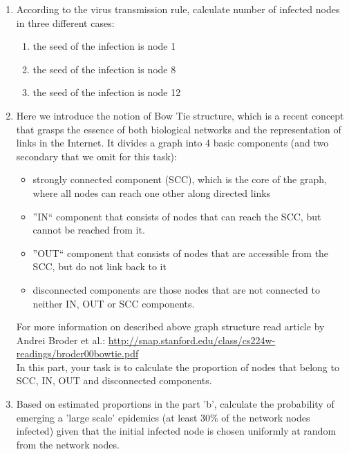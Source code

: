 \documentclass{article}
\begin{document}
\begin{enumerate}
\item According to the virus transmission rule, calculate number of infected nodes in three different cases:
\begin{enumerate}
\item  the seed of the infection is node 1
\item the seed of the infection is node 8
\item the seed of the infection is node 12
\end{enumerate} 
\item Here we introduce the notion of Bow Tie structure, which is a recent concept that grasps the essence of both biological networks and the representation of links in the Internet. It divides a graph into 4 basic components (and two secondary that we omit for this task):
\begin{itemize}
\item strongly connected component (SCC), which is the core of the graph, where all nodes can reach one other along directed links
\item  ''IN`` component that consists of nodes that can reach the SCC, but cannot be reached from it.
\item ''OUT`` component that consists of nodes that are accessible from the SCC, but do not link back to it
\item disconnected components are those nodes that are not connected to neither IN, OUT or SCC components. 
\end{itemize}
For more information on described above graph structure read article by Andrei Broder et al.: \url{http://snap.stanford.edu/class/cs224w-readings/broder00bowtie.pdf}\\
In this part, your task is to calculate the proportion of nodes that belong to SCC, IN, OUT and disconnected components.
\item Based on estimated proportions in the part 'b', calculate the probability of emerging a 'large scale' epidemics (at least 30\% of the network nodes infected) given that the initial infected node is chosen uniformly at random from the network nodes.
\end{enumerate}
\end{document}
